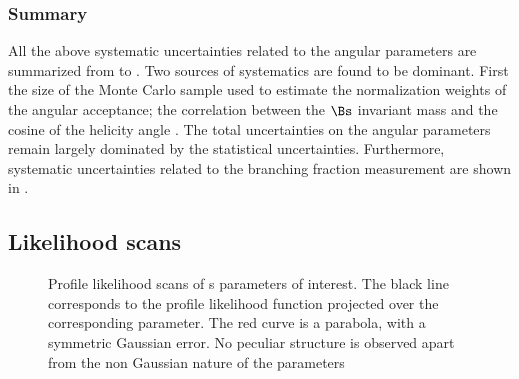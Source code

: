 \subsubsection{Summary}
\label{systSummary}
All the above systematic uncertainties related to the angular parameters are summarized from 
to . Two sources of systematics are found to be dominant. First the size of the Monte
Carlo sample used to estimate the normalization weights of the angular acceptance; the correlation between the $\Bs$ invariant
mass and the cosine of the helicity angle \thetamu. The total uncertainties on the angular parameters remain largely dominated
by the statistical uncertainties. Furthermore, systematic uncertainties related to the branching fraction measurement
are shown in .

\subsection{Likelihood scans}
\label{nllscans}

\begin{figure}[h]
  \centering
  \begin{subfigure}{0.5\textwidth}
    \scalebox{0.60}{}
    \caption{}
    \label{nll_ACP0}
  \end{subfigure}%
  \hfill%
  \begin{subfigure}{0.5\textwidth}
    \scalebox{0.60}{}
    \caption{}
    \label{nll_ACPperp}
  \end{subfigure}
  \begin{subfigure}{0.5\textwidth}
    \scalebox{0.60}{}
    \caption{}
    \label{nll_ACPpar}
  \end{subfigure}%
  \hfill%
  \begin{subfigure}{0.5\textwidth}
    \scalebox{0.60}{}
    \caption{}
    \label{nll_ACPS}
  \end{subfigure}
\caption{Profile likelihood scans of \Acp{} parameters of interest. The black line corresponds to the profile likelihood
         function projected over the corresponding parameter. The red curve is a parabola, with a symmetric Gaussian
         error. No peculiar structure is observed apart from the non Gaussian nature of the parameters}
\end{figure}

